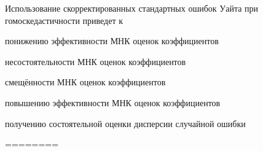 
\begin{question}
Использование скорректированных стандартных ошибок Уайта при
гомоскедастичности приведет к
\begin{answerlist}
  \item понижению эффективности МНК оценок коэффициентов
  \item несостоятельности МНК оценок коэффициентов
  \item смещённости МНК оценок коэффициентов
  \item повышению эффективности МНК оценок коэффициентов
  \item получению состоятельной оценки дисперсии случайной ошибки
\end{answerlist}
\end{question}

\begin{solution}
========
\end{solution}

